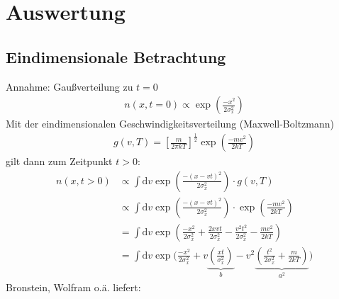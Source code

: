 \documentclass[10pt,a4paper]{extarticle}
\begin{document}
\newpage
\section*{Auswertung}
\subsection*{Eindimensionale Betrachtung}
Annahme: Gaußverteilung zu $t = 0$
\begin{align}
n(x, t= 0) \varpropto \exp\left(\frac{-x^2}{2 \sigma_x^2}\right)
\end{align}
Mit der eindimensionalen Geschwindigkeitsverteilung (Maxwell-Boltzmann) 
\begin{align}
g(v,T) = \left[\frac{m}{2 \pi k T}\right]^{\frac{1}{2}} \exp \left(\frac{-mv^2}{2kT}\right)
\end{align}
gilt dann zum Zeitpunkt $t>0$:
\begin{align}
n(x, t> 0) &\varpropto \int \mathrm{d}v \exp\left(\frac{-(x-vt)^2}{2 \sigma_x^2}\right) \cdot g(v,T) \\
&\varpropto \int \mathrm{d}v \exp\left(\frac{-(x-vt)^2}{2 \sigma_x^2}\right) \cdot \exp \left(\frac{-mv^2}{2kT}\right) \label{eq:falt} \\
&= \int \mathrm{d}v \exp\left(\frac{-x^2}{2 \sigma_x^2} + \frac{2xvt}{2 \sigma_x^2} - \frac{v^2 t^2}{2 \sigma_x^2} - \frac{mv^2}{2kT}\right) \\
&= \int \mathrm{d}v \exp\biggl(\frac{-x^2}{2 \sigma_x^2} + v \underbrace{\left( \frac{xt}{\sigma_x^2}\right)}_{b} - v^2 \underbrace{\left(\frac{t^2}{2 \sigma_x^2} + \frac{m}{2kT} \right)}_{a^2}\biggr) 
\end{align}
Bronstein, Wolfram o.ä. liefert:
\end{document}

